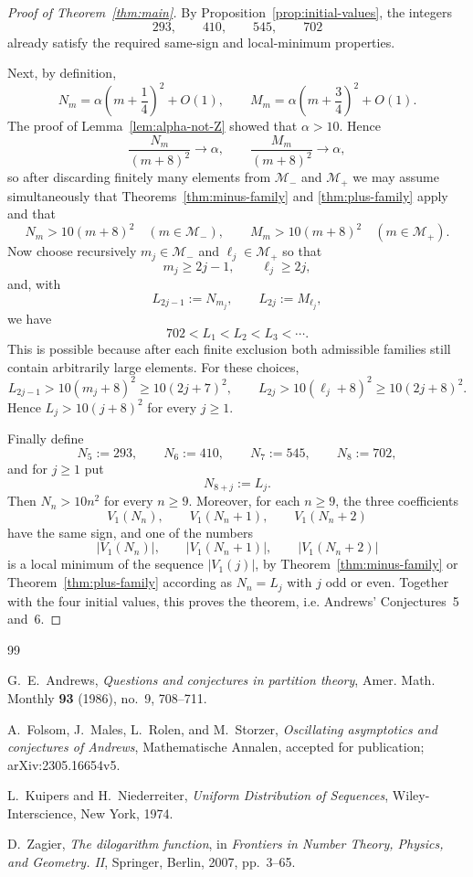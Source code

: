 \documentclass[reqno]{amsart}
\theoremstyle{definition}
\theoremstyle{plain}
\theoremstyle{remark}
\numberwithin{equation}{section}
\begin{document}
\begin{proof}[Proof of Theorem~\ref{thm:main}]
By Proposition~\ref{prop:initial-values}, the integers
\[
  293,\qquad 410,\qquad 545,\qquad 702
\]
already satisfy the required same-sign and local-minimum properties.

Next, by definition,
\[
  N_m=\alpha\left(m+\frac14\right)^2+O(1),
  \qquad
  M_m=\alpha\left(m+\frac34\right)^2+O(1).
\]
The proof of Lemma~\ref{lem:alpha-not-Z} showed that $\alpha>10$. Hence
\[
  \frac{N_m}{(m+8)^2}\to \alpha,
  \qquad
  \frac{M_m}{(m+8)^2}\to \alpha,
\]
so after discarding finitely many elements from $\mathcal M_-$ and $\mathcal M_+$ we may assume simultaneously that Theorems~\ref{thm:minus-family} and \ref{thm:plus-family} apply and that
\[
  N_m>10(m+8)^2\quad(m\in\mathcal M_-),
  \qquad
  M_m>10(m+8)^2\quad(m\in\mathcal M_+).
\]
Now choose recursively $m_j\in\mathcal M_-$ and $\ell_j\in\mathcal M_+$ so that
\[
  m_j\ge 2j-1,
  \qquad
  \ell_j\ge 2j,
\]
and, with
\[
  L_{2j-1}:=N_{m_j},
  \qquad
  L_{2j}:=M_{\ell_j},
\]
we have
\[
  702<L_1<L_2<L_3<\cdots.
\]
This is possible because after each finite exclusion both admissible families still contain arbitrarily large elements. For these choices,
\[
  L_{2j-1}>10(m_j+8)^2\ge 10(2j+7)^2,
  \qquad
  L_{2j}>10(\ell_j+8)^2\ge 10(2j+8)^2.
\]
Hence $L_j>10(j+8)^2$ for every $j\ge1$.

Finally define
\[
  N_5:=293,\qquad N_6:=410,\qquad N_7:=545,\qquad N_8:=702,
\]
and for $j\ge1$ put
\[
  N_{8+j}:=L_j.
\]
Then $N_n>10n^2$ for every $n\ge 9$. Moreover, for each $n\ge9$, the three coefficients
\[
  V_1(N_n),\qquad V_1(N_n+1),\qquad V_1(N_n+2)
\]
have the same sign, and one of the numbers
\[
  |V_1(N_n)|,\qquad |V_1(N_n+1)|,\qquad |V_1(N_n+2)|
\]
is a local minimum of the sequence $|V_1(j)|$, by Theorem~\ref{thm:minus-family} or Theorem~\ref{thm:plus-family} according as $N_n=L_j$ with $j$ odd or even. 
Together with the four initial values, this proves the theorem, i.e. Andrews' Conjectures~5 and~6.
\end{proof}

\begin{thebibliography}{99}

G.~E.~Andrews,
\emph{Questions and conjectures in partition theory},
Amer. Math. Monthly \textbf{93} (1986), no.~9, 708--711.

A.~Folsom, J.~Males, L.~Rolen, and M.~Storzer,
\emph{Oscillating asymptotics and conjectures of {A}ndrews},
Mathematische Annalen, accepted for publication; arXiv:2305.16654v5.

L.~Kuipers and H.~Niederreiter,
\emph{Uniform Distribution of Sequences},
Wiley-Interscience, New York, 1974.

D.~Zagier,
\emph{The dilogarithm function}, in \emph{Frontiers in Number Theory, Physics, and Geometry. II},
Springer, Berlin, 2007, pp.~3--65.

\end{thebibliography}
\end{document}
